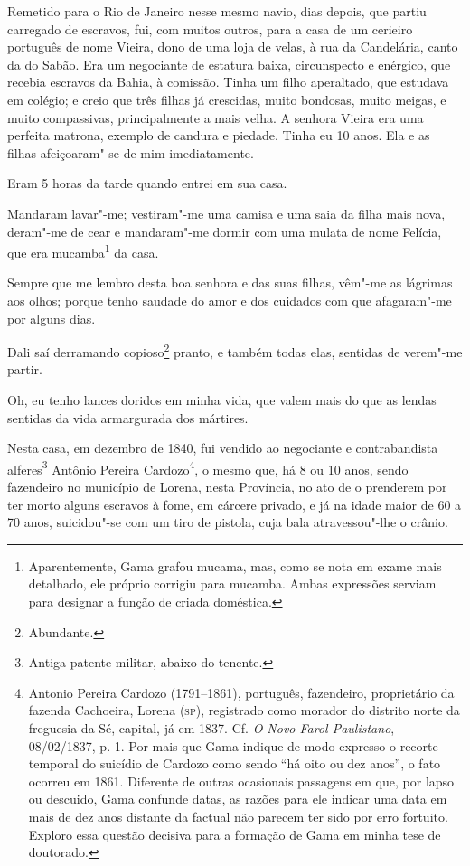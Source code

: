 Remetido para o Rio de Janeiro nesse mesmo navio, dias depois, que
partiu carregado de escravos, fui, com muitos outros, para a casa de um
cerieiro português de nome Vieira, dono de uma loja de velas, à rua da
Candelária, canto da do Sabão. Era um negociante de estatura baixa,
circunspecto e enérgico, que recebia escravos da Bahia, à comissão.
Tinha um filho aperaltado, que estudava em colégio; e creio que três
filhas já crescidas, muito bondosas, muito meigas, e muito compassivas,
principalmente a mais velha. A senhora Vieira era uma perfeita matrona,
exemplo de candura e piedade. Tinha eu 10 anos. Ela e as filhas
afeiçoaram"-se de mim imediatamente.

Eram 5 horas da tarde quando entrei em sua casa.

Mandaram lavar"-me; vestiram"-me uma camisa e uma saia da filha mais nova,
deram"-me de cear e mandaram"-me dormir com uma mulata de nome Felícia,
que era mucamba\footnote{Aparentemente, Gama grafou mucama, mas, como
  se nota em exame mais detalhado, ele próprio corrigiu para mucamba.
  Ambas expressões serviam para designar a função de criada doméstica.}
da casa.

Sempre que me lembro desta boa senhora e das suas filhas, vêm"-me as
lágrimas aos olhos; porque tenho saudade do amor e dos cuidados com que
afagaram"-me por alguns dias.

Dali saí derramando copioso\footnote{Abundante.} pranto, e também
todas elas, sentidas de verem"-me partir.

Oh, eu tenho lances doridos em minha vida, que valem mais do que as
lendas sentidas da vida armargurada dos mártires.

Nesta casa, em dezembro de 1840, fui vendido ao negociante e
contrabandista alferes\footnote{Antiga patente militar, abaixo do
  tenente.} Antônio Pereira Cardozo\footnote{Antonio Pereira Cardozo
  (1791--1861), português, fazendeiro, proprietário da fazenda Cachoeira,
  Lorena (\textsc{sp}), registrado como morador do distrito norte da freguesia da
  Sé, capital, já em 1837. Cf. \emph{O Novo Farol Paulistano},
  08/02/1837, p. 1. Por mais que Gama indique de modo expresso o
  recorte temporal do suicídio de Cardozo como sendo ``há oito ou dez
  anos'', o fato ocorreu em 1861. Diferente de outras ocasionais
  passagens em que, por lapso ou descuido, Gama confunde datas, as razões
  para ele indicar uma data em mais de dez anos distante da factual não
  parecem ter sido por erro fortuito. Exploro essa questão decisiva para
  a formação de Gama em minha tese de doutorado.}, o mesmo que, há 8 ou
10 anos, sendo fazendeiro no município de Lorena, nesta Província, no
ato de o prenderem por ter morto alguns escravos à fome, em cárcere
privado, e já na idade maior de 60 a 70 anos, suicidou"-se com um tiro de
pistola, cuja bala atravessou"-lhe o crânio.

